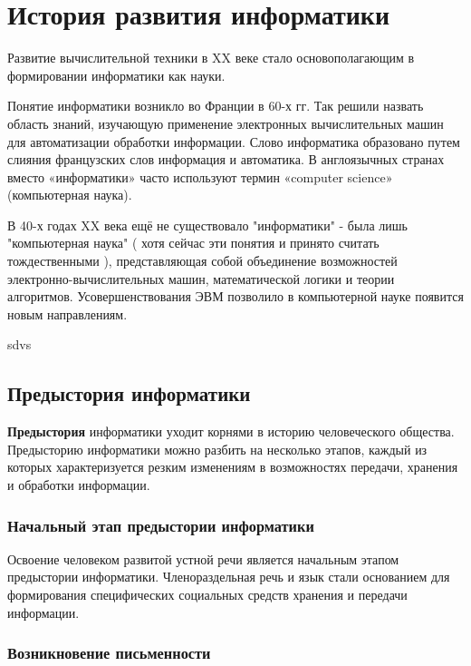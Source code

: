 \chapter{История развития информатики} \label{chapt1}

Развитие вычислительной техники в XX веке стало основополагающим в  формировании информатики как науки.

Понятие информатики возникло  во Франции в 60-х гг. Так решили назвать область знаний, изучающую применение электронных вычислительных машин для автоматизации обработки информации. Слово информатика образовано путем слияния французских слов информация и автоматика. В англоязычных странах вместо «информатики» часто используют термин «computer science» (компьютерная наука).

В 40-х годах XX века ещё не существовало "информатики" - была лишь "компьютерная наука" ( хотя сейчас эти понятия и принято считать тождественными ), представляющая собой объединение возможностей электронно-вычислительных машин, математической логики и теории алгоритмов. Усовершенствования ЭВМ позволило в компьютерной науке появится новым направлениям.  \cite{bib102}

sdvs\cite{bib201}


\section{Предыстория информатики} \label{sect1_1}

\textbf{Предыстория} информатики уходит корнями в историю человеческого общества. Предысторию информатики можно разбить на несколько этапов, каждый из которых характеризуется резким изменениям в возможностях передачи, хранения и обработки информации.

\subsection{Начальный этап предыстории информатики} \label{subsect1_1_1}

Освоение человеком развитой устной речи является начальным этапом предыстории информатики. Членораздельная речь и язык стали основанием для формирования специфических социальных средств хранения и передачи информации. 

\subsection{Возникновение письменности} \label{subsect1_1_2}

